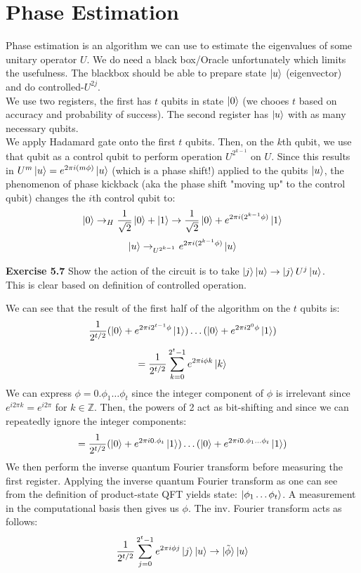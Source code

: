 \documentclass{article}
\begin{document}
\section{Phase Estimation}
Phase estimation is an algorithm we can use to estimate the eigenvalues of some unitary operator $U$. We do need a black box/Oracle unfortunately which limits the usefulness. The blackbox should be able to prepare state $\ket{u}$ (eigenvector) and do controlled-$U^{2j}$.\\
We use two registers, the first has $t$  qubits in state $\ket{0}$ (we chooes $t$ based on accuracy and probability of success). The second register has $\ket{u}$ with as many necessary qubits.\\
We apply Hadamard gate onto the first $t$ qubits. Then, on the $k$th qubit, we use that qubit as a control qubit to perform operation $U^{2^{k-1}}$ on $U$. Since this results in $U^m\ket{u} = e^{2\pi i (m \phi)} \ket u$ (which is a phase shift!) applied to the qubits $\ket{u}$, the phenomenon of phase kickback (aka the phase shift "moving up" to the control qubit) changes the $i$th control qubit to:
$$\ket0 \to_H \frac{1}{\sqrt2}\ket0 + \ket1 \to \frac{1}{\sqrt2}\ket0 + e^{2\pi i (2^{k-1}\phi)}\ket1$$
$$\ket{u} \to_{U^{2^{k-1}}} e^{2\pi i (2^{k-1} \phi)}\ket{u}$$
\begin{tcolorbox}\textbf{Exercise 5.7} Show the action of the circuit is to take $\ket{j}\ket{u} \to \ket{j}U^j \ket{u}$.\\
	This is clear based on definition of controlled operation.
\end{tcolorbox}
We can see that the result of the first half of the algorithm on the $t$ qubits is:
$$\frac{1}{2^{t/2}} (\ket{0} + e^{2\pi i 2^{t-1}\phi}\ket{1})\dots(\ket0 + e^{2\pi i 2^0 \phi}\ket1)$$
$$= \frac{1}{2^{t/2}} \sum^{2^t-1}_{k=0} e^{2\pi i \phi k}\ket{k}$$
We can express $\phi = 0.\phi_1 \dots \phi_t$ since the integer component of $\phi$ is irrelevant since $e^{i2\pi k} = e^{i2\pi}$ for $k \in \mathbb{Z}$. Then, the powers of 2 act as bit-shifting and since we can repeatedly ignore the integer components:
$$=\frac{1}{2^{t/2}}(\ket 0 + e^{2\pi i 0.\phi_t}\ket1)\dots(\ket0 + e^{2\pi i 0.\phi_1\dots\phi_t}\ket1)$$
We then perform the inverse quantum Fourier transform before measuring the first register. Applying the inverse quantum Fourier transform as one can see from the definition of product-state QFT yields state:
$\ket{\phi_1 \dots \phi_t}$. A measurement in the computational basis then gives us $\phi$.
The inv. Fourier transform acts as follows:
$$\frac{1}{2^{t/2}} \sum^{2^t-1}_{j=0} e^{2\pi i \phi j} \ket{j} \ket{u}\to \ket{\tilde{\phi}}\ket{u}$$
\end{document}
